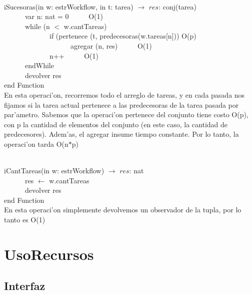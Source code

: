 \documentclass[a4paper,10pt]{article}
\begin{document}
\begin{algoritmo}
\caption{}\\
  iSucesoras(in w: estrWorkflow, in t: tarea) $\rightarrow$ $res$: conj(tarea)\\
    \indent \ \ \ \ \ \  var n: nat = 0 \ \ \ \ \ O(1) \\
    \indent \ \ \ \ \ \  while (n $<$ w.cantTareas) \\
    \indent \ \ \ \ \ \ \ \ \ \ \ \ \ if (pertenece (t, predecesoras(w.tareas[n])) O(p)\\
    \indent \ \ \ \ \ \ \ \ \ \ \ \ \ \ \ \ \ \ \ agregar (n, res) \ \ \ \ \ O(1) \\
    \indent \ \ \ \ \ \ \ \ \ \ \ \ \ n++ \ \ \ \ \ O(1) \\
    \indent \ \ \ \ \ \  endWhile \\
    \indent \ \ \ \ \ \  devolver res    \\
   end Function \\
   
   En esta operaci'on, recorremos todo el arreglo de tareas, y en cada pasada nos fijamos si la tarea actual pertenece a las predecesoras de la tarea pasada por par'ametro. Sabemos que la operaci'on pertenece del conjunto tiene costo O(p), con p la cantidad de elementos del conjunto (en este caso, la cantidad de predecesores). Adem'as, el agregar insume tiempo constante. Por lo tanto, la operaci'on tarda O(n$*$p)
\end{algoritmo}

\begin{algoritmo}
\caption{}\\
  iCantTareas(in w: estrWorkflow) $\rightarrow$ $res$: nat\\
    \indent \ \ \ \ \ \  res $\gets$ w.cantTareas \\
    \indent \ \ \ \ \ \  devolver res    \\
   end Function \\
   
   En esta operaci'on simplemente devolvemos un observador de la tupla, por lo tanto es O(1)
\end{algoritmo}

\newpage

\section{UsoRecursos}

\subsection{Interfaz}
\end{document}
